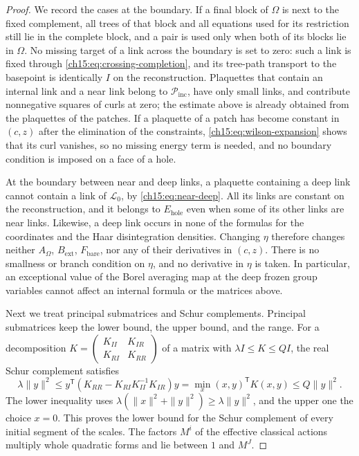 \begin{proof}
We record the cases at the boundary. If a final block of $\Omega$ is next to the fixed complement, all trees of that block and all equations used for its restriction still lie in the complete block, and a pair is used only when both of its blocks lie in $\Omega$. No missing target of a link across the boundary is set to zero: such a link is fixed through \eqref{ch15:eq:crossing-completion}, and its tree-path transport to the basepoint is identically $I$ on the reconstruction. Plaquettes that contain an internal link and a near link belong to $\mathcal P_{\mathrm{inc}}$, have only small links, and contribute nonnegative squares of curls at zero; the estimate above is already obtained from the plaquettes of the patches. If a plaquette of a patch has become constant in $(c,z)$ after the elimination of the constraints, \eqref{ch15:eq:wilson-expansion} shows that its curl vanishes, so no missing energy term is needed, and no boundary condition is imposed on a face of a hole.

At the boundary between near and deep links, a plaquette containing a deep link cannot contain a link of $\mathcal L_0$, by \eqref{ch15:eq:near-deep}. All its links are constant on the reconstruction, and it belongs to $E_{\mathrm{hole}}$ even when some of its other links are near links. Likewise, a deep link occurs in none of the formulas for the coordinates and the Haar disintegration densities. Changing $\eta$ therefore changes neither $A_\Omega$, $B_{\mathrm{ext}}$, $F_{\mathrm{bare}}$, nor any of their derivatives in $(c,z)$. There is no smallness or branch condition on $\eta$, and no derivative in $\eta$ is taken. In particular, an exceptional value of the Borel averaging map at the deep frozen group variables cannot affect an internal formula or the matrices above.

Next we treat principal submatrices and Schur complements. Principal submatrices keep the lower bound, the upper bound, and the range. For a decomposition $K=\left(\begin{smallmatrix}K_{II}&K_{IR}\\K_{RI}&K_{RR}\end{smallmatrix}\right)$ of a matrix with $\lambda I\le K\le QI$, the real Schur complement satisfies
\begin{equation}\label{ch15:eq:bare-schur}
 \lambda\|y\|^2\le
 y^{\mathsf T}(K_{RR}-K_{RI}K_{II}^{-1}K_{IR})y
 =\min_x(x,y)^{\mathsf T}K(x,y)\le Q\|y\|^2 .
\end{equation}
The lower inequality uses $\lambda(\|x\|^2+\|y\|^2)\ge\lambda\|y\|^2$, and the upper one the choice $x=0$. This proves the lower bound for the Schur complement of every initial segment of the scales. The factors $M^i$ of the effective classical actions multiply whole quadratic forms and lie between $1$ and $M^J$.


\end{proof}

